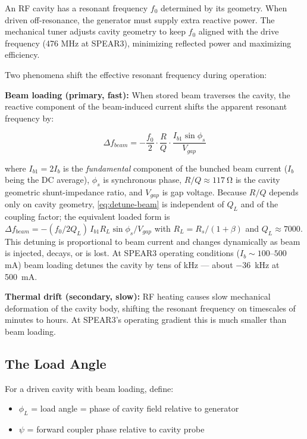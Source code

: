 An RF cavity has a resonant frequency \(f_0\) determined by its geometry. When driven off-resonance, the generator must supply extra reactive power. The mechanical tuner adjusts cavity geometry to keep \(f_0\) aligned with the drive frequency (476 MHz at SPEAR3), minimizing reflected power and maximizing efficiency.

Two phenomena shift the effective resonant frequency during operation:

\textbf{Beam loading (primary, fast):} When stored beam traverses the cavity, the reactive component of the beam-induced current shifts the apparent resonant frequency by:

\begin{equation}\label{eq:detune-beam}
  \Delta f_{beam} = -\frac{f_0}{2}\cdot\frac{R}{Q}\cdot\frac{I_{b1}\sin\phi_s}{V_{gap}}
\end{equation}

where \(I_{b1} = 2 I_b\) is the \emph{fundamental} component of the bunched beam current (\(I_b\) being the DC average), \(\phi_s\) is synchronous phase, \(R/Q \approx \qty{117}{\ohm}\) is the cavity geometric shunt-impedance ratio, and \(V_{gap}\) is gap voltage. Because \(R/Q\) depends only on cavity geometry, \cref{eq:detune-beam} is independent of \(Q_L\) and of the coupling factor; the equivalent loaded form is \(\Delta f_{beam} = -(f_0/2Q_L)\,I_{b1}R_L\sin\phi_s/V_{gap}\) with \(R_L = R_s/(1+\beta)\) and \(Q_L \approx 7000\). This detuning is proportional to beam current and changes dynamically as beam is injected, decays, or is lost. At SPEAR3 operating conditions (\(I_b \sim 100\text{–}500\) mA) beam loading detunes the cavity by tens of kHz --- about \qty{-36}{\kilo\hertz} at \qty{500}{\milli\ampere}.

\textbf{Thermal drift (secondary, slow):} RF heating causes slow mechanical deformation of the cavity body, shifting the resonant frequency on timescales of minutes to hours. At SPEAR3's operating gradient this is much smaller than beam loading.

\subsection{The Load Angle}\label{sec:load-angle}


For a driven cavity with beam loading, define:

\begin{itemize}
\tightlist
\item
  \(\phi_L\) = load angle = phase of cavity field relative to generator
\item
  \(\psi\) = forward coupler phase relative to cavity probe
\end{itemize}


